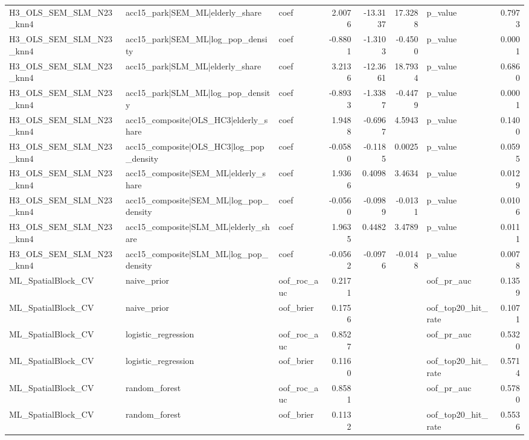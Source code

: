 \begin{center}
{{\begin{tabular}{lllrrrlr}
H3\_OLS\_SEM\_SLM\_N23\_knn4 & acc15\_park|SEM\_ML|elderly\_share & coef & 2.0076 & -13.3137 & 17.3288 & p\_value & 0.7973 \\
H3\_OLS\_SEM\_SLM\_N23\_knn4 & acc15\_park|SEM\_ML|log\_pop\_density & coef & -0.8801 & -1.3103 & -0.4500 & p\_value & 0.0001 \\
H3\_OLS\_SEM\_SLM\_N23\_knn4 & acc15\_park|SLM\_ML|elderly\_share & coef & 3.2136 & -12.3661 & 18.7934 & p\_value & 0.6860 \\
H3\_OLS\_SEM\_SLM\_N23\_knn4 & acc15\_park|SLM\_ML|log\_pop\_density & coef & -0.8933 & -1.3387 & -0.4479 & p\_value & 0.0001 \\
H3\_OLS\_SEM\_SLM\_N23\_knn4 & acc15\_composite|OLS\_HC3|elderly\_share & coef & 1.9488 & -0.6967 & 4.5943 & p\_value & 0.1400 \\
H3\_OLS\_SEM\_SLM\_N23\_knn4 & acc15\_composite|OLS\_HC3|log\_pop\_density & coef & -0.0580 & -0.1185 & 0.0025 & p\_value & 0.0595 \\
H3\_OLS\_SEM\_SLM\_N23\_knn4 & acc15\_composite|SEM\_ML|elderly\_share & coef & 1.9366 & 0.4098 & 3.4634 & p\_value & 0.0129 \\
H3\_OLS\_SEM\_SLM\_N23\_knn4 & acc15\_composite|SEM\_ML|log\_pop\_density & coef & -0.0560 & -0.0989 & -0.0131 & p\_value & 0.0106 \\
H3\_OLS\_SEM\_SLM\_N23\_knn4 & acc15\_composite|SLM\_ML|elderly\_share & coef & 1.9635 & 0.4482 & 3.4789 & p\_value & 0.0111 \\
H3\_OLS\_SEM\_SLM\_N23\_knn4 & acc15\_composite|SLM\_ML|log\_pop\_density & coef & -0.0562 & -0.0976 & -0.0148 & p\_value & 0.0078 \\
ML\_SpatialBlock\_CV & naive\_prior & oof\_roc\_auc & 0.2171 &  &  & oof\_pr\_auc & 0.1359 \\
ML\_SpatialBlock\_CV & naive\_prior & oof\_brier & 0.1756 &  &  & oof\_top20\_hit\_rate & 0.1071 \\
ML\_SpatialBlock\_CV & logistic\_regression & oof\_roc\_auc & 0.8527 &  &  & oof\_pr\_auc & 0.5320 \\
ML\_SpatialBlock\_CV & logistic\_regression & oof\_brier & 0.1160 &  &  & oof\_top20\_hit\_rate & 0.5714 \\
ML\_SpatialBlock\_CV & random\_forest & oof\_roc\_auc & 0.8581 &  &  & oof\_pr\_auc & 0.5780 \\
ML\_SpatialBlock\_CV & random\_forest & oof\_brier & 0.1132 &  &  & oof\_top20\_hit\_rate & 0.5536 \\
\bottomrule
\end{tabular}
}
}
\end{center}
